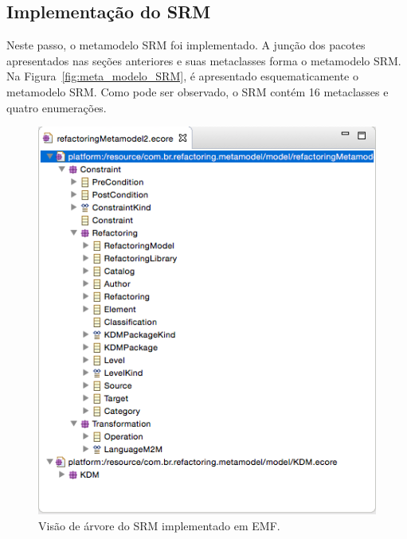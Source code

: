 


\subsection{Implementação do SRM}\label{sec:implementacao_do_SRM}

Neste passo, o metamodelo SRM foi implementado. A junção dos pacotes apresentados nas seções anteriores e suas metaclasses forma o metamodelo SRM. Na Figura~\ref{fig:meta_modelo_SRM}, é apresentado esquematicamente o metamodelo SRM. Como pode ser observado, o SRM contém 16 metaclasses e quatro enumerações. 

\begin{figure}[h]
	\centering
	\caption{Visão de árvore do SRM implementado em EMF.}
	\label{fig:visao_arvore_srm_emf}
	\includegraphics[scale=0.63]{images/newECORESRM}
	\fautor
\end{figure}

